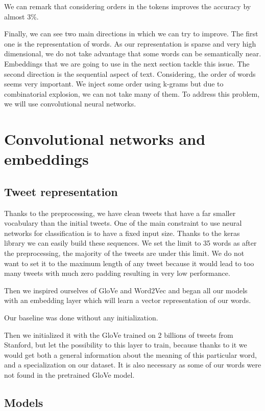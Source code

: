 \documentclass[10pt,conference,compsocconf]{IEEEtran}
\begin{document}
We can remark that considering orders in the tokens improves the accuracy by almost 3\%.

Finally, we can see two main directions in which we can try to improve. The first one is the representation of words. As our representation is sparse and very high dimensional, we do not take advantage that some words can be semantically near. Embeddings that we are going to use in the next section tackle this issue. The second direction is the sequential aspect of text. Considering, the order of words seems very important. We inject some order using k-grams but due to combinatorial explosion, we can not take many of them. To address this problem, we will use convolutional neural networks.

\section{Convolutional networks and embeddings}

\subsection{Tweet representation}

Thanks to the preprocessing, we have clean tweets that have a far smaller vocabulary than the initial tweets. One of the main constraint to use neural networks for classification is to have a fixed input size. Thanks to the keras library we can easily build these sequences. We set the limit to 35 words as after the preprocessing, the majority of the tweets are under this limit. We do not want to set it to the maximum length of any tweet because it would lead to too many tweets with much zero padding resulting in very low performance.

Then we inspired ourselves of GloVe and Word2Vec and began all our models with an embedding layer which will learn a vector representation of our words.

Our baseline was done without any initialization.

Then we initialized it with the GloVe trained on 2 billions of tweets from Stanford, but let the possibility to this layer to train, because thanks to it we would get both a general information about the meaning of this particular word, and a specialization on our dataset. It is also necessary as some of our words were not found in the pretrained GloVe model.

\subsection{Models}
\end{document}

